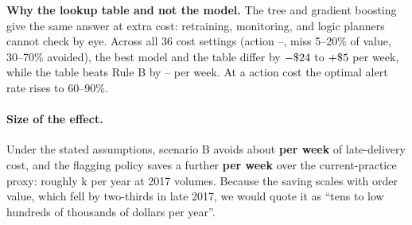 \textbf{Why the lookup table and not the model.} The tree and gradient boosting give the same
answer at extra cost: retraining, monitoring, and logic planners cannot check by eye. Across all
36 cost settings (action --, miss 5--20\% of value, 30--70\% avoided), the best model
and the table differ by $-\$24$ to $+\$5$ per week, while the table beats Rule B by
-- per week. At a  action cost the optimal alert rate rises to 60--90\%.

\paragraph{Size of the effect.} Under the stated assumptions, scenario B avoids about
\textbf{ per week} of late-delivery cost, and the flagging policy saves a further
\textbf{ per week} over the current-practice proxy: roughly k per year at 2017
volumes. Because the saving scales with order value, which fell by two-thirds in late 2017, we
would quote it as ``tens to low hundreds of thousands of dollars per year''.
